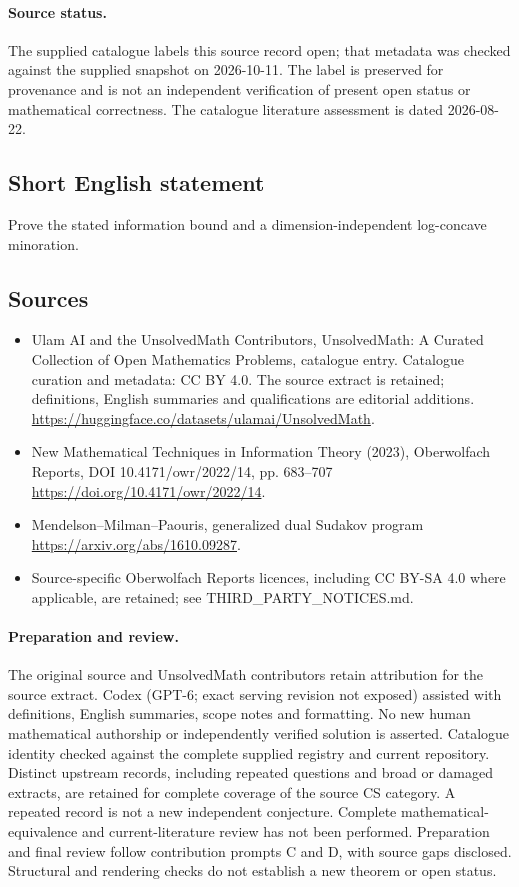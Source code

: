 \documentclass[11pt]{article}
\begin{document}
\paragraph{Source status.}
The supplied catalogue labels this source record open; that metadata was checked against the supplied snapshot on 2026-10-11. The label is preserved for provenance and is not an independent verification of present open status or mathematical correctness. The catalogue literature assessment is dated 2026-08-22.
\subsection{Short English statement}
Prove the stated information bound and a dimension-independent log-concave minoration.
\subsection{Sources}
\begin{itemize}
\item[S1] Ulam AI and the UnsolvedMath Contributors, UnsolvedMath: A Curated Collection of Open Mathematics Problems, catalogue entry. Catalogue curation and metadata: CC BY 4.0. The source extract is retained; definitions, English summaries and qualifications are editorial additions.
\url{https://huggingface.co/datasets/ulamai/UnsolvedMath}.
\item[S2] New Mathematical Techniques in Information Theory (2023), Oberwolfach Reports, DOI 10.4171/owr/2022/14, pp. 683--707
\url{https://doi.org/10.4171/owr/2022/14}.
\item[S3] Mendelson--Milman--Paouris, generalized dual Sudakov program
\url{https://arxiv.org/abs/1610.09287}.
\item Source-specific Oberwolfach Reports licences, including CC BY-SA 4.0 where applicable, are retained; see THIRD\_PARTY\_NOTICES.md.
\end{itemize}
\paragraph{Preparation and review.}
The original source and UnsolvedMath contributors retain attribution for the source extract. Codex (GPT-6; exact serving revision not exposed) assisted with definitions, English summaries, scope notes and formatting. No new human mathematical authorship or independently verified solution is asserted. Catalogue identity checked against the complete supplied registry and current repository. Distinct upstream records, including repeated questions and broad or damaged extracts, are retained for complete coverage of the source CS category. A repeated record is not a new independent conjecture. Complete mathematical-equivalence and current-literature review has not been performed. Preparation and final review follow contribution prompts C and D, with source gaps disclosed. Structural and rendering checks do not establish a new theorem or open status.
\label{end:statement}
\end{document}

